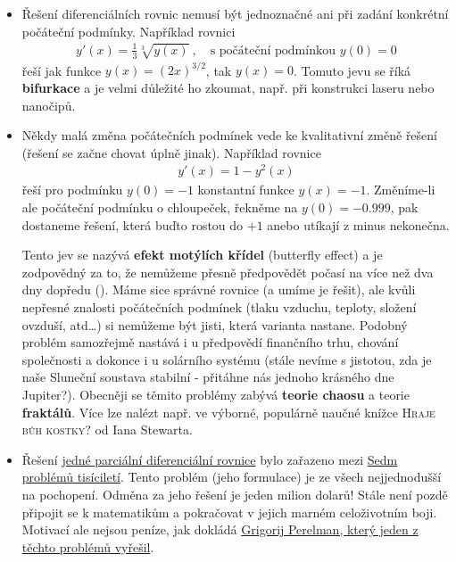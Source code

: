 \begin{itemize}
    \item Řešení diferenciálních rovnic nemusí být jednoznačné ani při zadání konkrétní počáteční podmínky. Například rovnici 
    \begin{align}
        y'(x) = \frac{1}{3} \sqrt[3]{y(x)}  \:, \quad \text{s počáteční podmínkou } y(0) = 0
    \end{align}
    řeší jak funkce $y(x) = (2 x)^{3/2}$, tak $y(x) = 0$. Tomuto jevu se říká \textbf{bifurkace} a je velmi důležité ho zkoumat, např. při konstrukci laseru nebo nanočipů.

    \item Někdy malá změna počátečních podmínek vede ke kvalitativní změně řešení (řešení se začne chovat úplně jinak). Například rovnice
    \begin{align}
        y'(x) = 1 - y^2(x)
    \end{align}
    řeší pro podmínku $y(0) = -1$ konstantní funkce $y(x) = -1$. Změníme-li ale počáteční podmínku o chloupeček, řekněme na $y(0) = -0.999$, pak dostaneme řešení, která buďto rostou do $+1$ anebo utíkají z minus nekonečna.

    Tento jev se nazývá \textbf{efekt motýlích křídel} (butterfly effect) a je zodpovědný za to, že nemůžeme přesně předpovědět počasí na více než dva dny dopředu (). Máme sice správné rovnice (a umíme je řešit), ale kvůli nepřesné znalosti počátečních podmínek (tlaku vzduchu, teploty, složení ovzduší, atd\dots) si nemůžeme být jisti, která varianta nastane. Podobný problém samozřejmě nastává i u předpovědí finančního trhu, chování společnosti a dokonce i u solárního systému (stále nevíme s jistotou, zda je naše Sluneční soustava stabilní - přitáhne nás jednoho krásného dne Jupiter?). Obecněji se těmito problémy zabývá \textbf{teorie chaosu} a teorie \textbf{fraktálů}. Více lze nalézt např. ve výborné, populárně naučné knížce \textsc{Hraje bůh kostky?} od Iana Stewarta.

    \item Řešení \href{https://en.wikipedia.org/wiki/Navier%E2%80%93Stokes_equations}{jedné parciální diferenciální rovnice} bylo zařazeno mezi 
    \href{https://en.wikipedia.org/wiki/Millennium_Prize_Problems}{Sedm problémů tisíciletí}. Tento problém (jeho formulace) je ze všech nejjednodušší na pochopení. Odměna za jeho řešení je jeden milion dolarů! Stále není pozdě připojit se k matematikům a pokračovat v jejich marném celoživotním boji. Motivací ale nejsou peníze, jak dokládá \href{https://www.youtube.com/watch?v=vNcarnNJPqs}{Grigorij Perelman, který jeden z těchto problémů vyřešil}.


\end{itemize}
